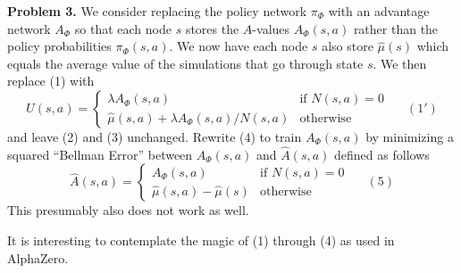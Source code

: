 \documentclass{article}
\begin{document}
\bigskip
{\bf Problem 3.}
We consider replacing the policy network $\pi_\Phi$ with an advantage network $A_\Phi$ so that each node $s$ stores the $A$-values $A_\Phi(s,a)$ rather than
the policy probabilities $\pi_\Phi(s,a)$.  We now have each node $s$ also store $\hat{\mu}(s)$ which equals the average value of the simulations that go through state $s$.
We then replace (1) with
$$U(s,a) =  \left\{\begin{array}{ll}\lambda A_\Phi(s,a) &\mbox{if $N(s,a) = 0$} \\ \hat{\mu}(s,a) + \lambda A_\Phi(s,a)/N(s,a) & \mbox{otherwise} \end{array}\right.\;\;\;\;\;(1')$$
and leave (2) and (3) unchanged.  Rewrite (4) to train $A_\Phi(s,a)$ by minimizing a squared ``Bellman Error'' between $A_\Phi(s,a)$ and $\hat{A}(s,a)$ defined as follows
$$\hat{A}(s,a) =  \left\{\begin{array}{ll}A_\Phi(s,a) &\mbox{if $N(s,a) = 0$} \\ \hat{\mu}(s,a) - \hat{\mu}(s) & \mbox{otherwise} \end{array}\right.\;\;\;\;\;(5)$$
This presumably also does not work as well.

\bigskip
It is interesting to contemplate the magic of (1) through (4) as used in AlphaZero.
\end{document}
